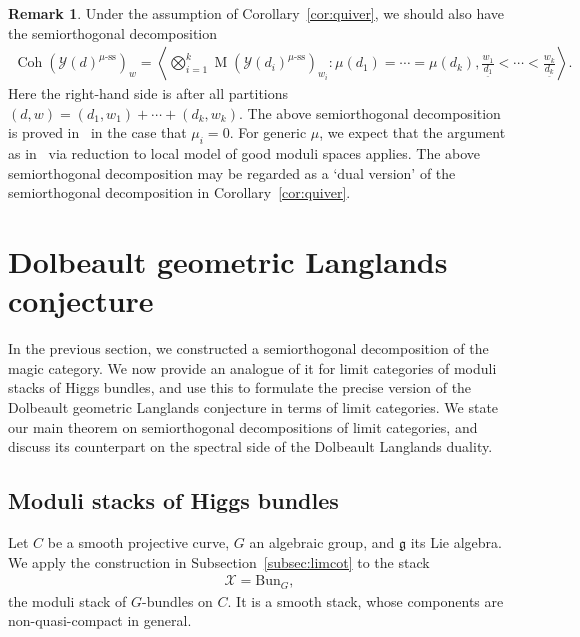 \documentclass [11pt,oneside,a4paper,mathscr]{amsart}
\theoremstyle{definition}
\newtheorem{remark}[thm]{Remark}
\newcommand{\Y}{\mathcal{Y}}
\newcommand{\MM}{\operatorname{M}}
\newcommand{\X}{\mathcal{X}}
\newcommand{\fg}{\mathfrak{g}}
\newcommand{\Coh}{\operatorname{Coh}}
\newcommand{\Bun}{\mathrm{Bun}}
\begin{document}
\begin{remark}\label{rmk:quiver}
Under the assumption of Corollary~\ref{cor:quiver}, 
we should also have the semiorthogonal decomposition 
    \begin{align*}
    \Coh(\Y(d)^{\mu\text{-ss}})_w=\left\langle  \bigotimes_{i=1}^k \MM(\Y(d_i)^{\mu\text{-ss}})_{w_i} :
    \mu(d_1)=\cdots= \mu(d_k), \frac{w_1}{\underline{d_1}}<\cdots<\frac{w_k}{\underline{d_k}} \right\rangle. 
\end{align*}
Here the right-hand side is after all partitions $(d, w)=(d_1, w_1)+\cdots+(d_k, w_k)$. 
   The above semiorthogonal decomposition is proved in~\cite{PTquiver} in the 
   case that $\mu_i=0$. For generic $\mu$, we expect that 
   the argument as in~\cite{PTK3, PThiggs} 
   via reduction to local model of good moduli spaces applies. The above 
   semiorthogonal decomposition
   may be regarded as a `dual version' of the semiorthogonal 
   decomposition in Corollary~\ref{cor:quiver}. 
\end{remark}







\section{Dolbeault geometric Langlands conjecture}
In the previous section, we constructed a semiorthogonal decomposition of the magic category. We now provide an analogue of it for limit categories of moduli stacks of Higgs bundles, and use this to formulate the precise version of the Dolbeault geometric Langlands conjecture in terms of limit categories.
We state our main theorem on semiorthogonal decompositions of 
limit categories, and discuss its counterpart on the spectral side of the Dolbeault Langlands duality.

\subsection{Moduli stacks of Higgs bundles}\label{subsec:limHiggs}
Let $C$ be a smooth projective curve, $G$ an algebraic group, and $\fg$ its Lie algebra. 
We apply the construction in Subsection~\ref{subsec:limcot} to the stack
\begin{align*}\X=\Bun_G,\end{align*}
the moduli stack of $G$-bundles on $C$. It is a smooth stack, whose  
components are non-quasi-compact in general. 
\end{document}

